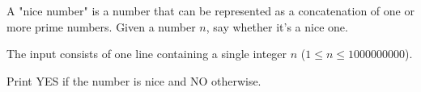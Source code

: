 \problemname{\problemyamlname}


\newcommand{\minn}{1}
\newcommand{\maxn}{1000000000}

A "nice number" is a number that can be represented as a concatenation of one or more prime numbers. Given a number $n$, say whether it's a nice one.

\begin{Input}
    The input consists of one line containing a single integer $n$ ($\minn\leq n\leq \maxn$).
\end{Input}

\begin{Output}
    Print YES if the number is nice and NO otherwise.
\end{Output}
